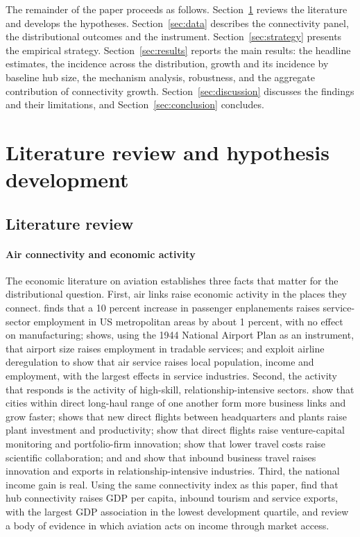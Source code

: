 The remainder of the paper proceeds as follows. Section~\ref{sec:literature} reviews the literature and develops the hypotheses. Section~\ref{sec:data} describes the connectivity panel, the distributional outcomes and the instrument. Section~\ref{sec:strategy} presents the empirical strategy. Section~\ref{sec:results} reports the main results: the headline estimates, the incidence across the distribution, growth and its incidence by baseline hub size, the mechanism analysis, robustness, and the aggregate contribution of connectivity growth. Section~\ref{sec:discussion} discusses the findings and their limitations, and Section~\ref{sec:conclusion} concludes.

\section{Literature review and hypothesis development}
\label{sec:literature}
\subsection{Literature review}
\label{sec:litreview}
\paragraph{Air connectivity and economic activity}
The economic literature on aviation establishes three facts that matter for the distributional question. First, air links raise economic activity in the places they connect. \citet{Brueckner_2003} finds that a 10 percent increase in passenger enplanements raises service-sector employment in US metropolitan areas by about 1 percent, with no effect on manufacturing; \citet{Sheard_2014} shows, using the 1944 National Airport Plan as an instrument, that airport size raises employment in tradable services; and \citet{Blonigen_2015} exploit airline deregulation to show that air service raises local population, income and employment, with the largest effects in service industries. Second, the activity that responds is the activity of high-skill, relationship-intensive sectors. \citet{Campante_2018} show that cities within direct long-haul range of one another form more business links and grow faster; \citet{Giroud_2013} shows that new direct flights between headquarters and plants raise plant investment and productivity; \citet{Bernstein_2016} show that direct flights raise venture-capital monitoring and portfolio-firm innovation; \citet{Catalini_2020} show that lower travel costs raise scientific collaboration; and \citet{Hovhannisyan_2015} and \citet{Cristea_2011} show that inbound business travel raises innovation and exports in relationship-intensive industries. Third, the national income gain is real. Using the same connectivity index as this paper, \citet{Yue_2026} find that hub connectivity raises GDP per capita, inbound tourism and service exports, with the largest GDP association in the lowest development quartile, and \citet{Lenaerts_2021} review a body of evidence in which aviation acts on income through market access.

